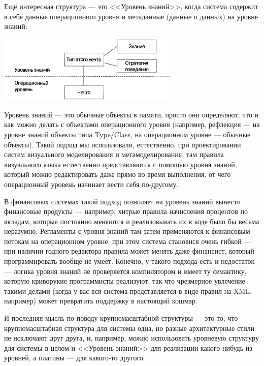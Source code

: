 \documentclass[a5paper]{article}
\begin{document}
Ещё интересная структура --- это <<Уровень знаний>>, когда система содержит в себе данные операционного уровня и метаданные (данные о данных) на уровне знаний:

\begin{center}
    \includegraphics[width=0.65\textwidth]{knowledgeLevel.png}
\end{center}

Уровень знаний --- это обычные объекты в памяти, просто они определяют, что и как можно делать с объектами операционного уровня (например, рефлекция --- на уровне знаний объекты типа Type/Class, на операционном уровне --- обычные объекты). Такой подход мы использовали, естественно, при проектировании систем визуального моделирования и метамоделирования, там правила визуального языка естественно представляются с помощью уровня знаний, который можно редактировать даже прямо во время выполнения, от чего операционный уровень начинает вести себя по-другому. 

В финансовых системах такой подход позволяет на уровень знаний вынести финансовые продукты --- например, хитрые правила начисления процентов по вкладам, которые постоянно меняются и реализовывать их в коде было бы весьма неразумно. Регламенты с уровня знаний там затем применяются к финансовым потокам на операционном уровне, при этом система становися очень гибкой --- при наличии годного редактора правила может менять даже финансист, который программировать вообще не умеет. Конечно, у такого подхода есть и недостаток --- логика уровня знаний не проверяется компилятором и имеет ту семантику, которую криворукие программисты реализуют, так что чрезмерное увлечение такими делами (когда у вас вся система представляется в виде правил на XML, например) может превратить поддержку в настоящий кошмар.

И последняя мысль по поводу крупномасштабной структуры --- это то, что крупномасштабная структура для системы одна, но разные архитектурные стили не исключают друг друга, и, например, можно использовать уровневую структуру для системы в целом и <<Уровень знаний>> для реализации какого-нибудь из уровней, а плагины --- для какого-то другого.
\end{document}
